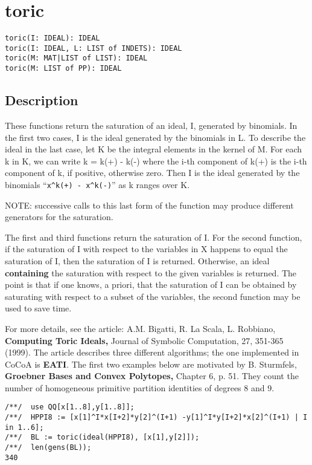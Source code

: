 \documentclass[a4paper]{mybook}
\newenvironment{command}{}{} %
\begin{document}
\section{toric}
\label{toric}
\begin{command} %


\begin{Verbatim}[label=syntax, rulecolor=\color{MidnightBlue},
frame=single]
toric(I: IDEAL): IDEAL
toric(I: IDEAL, L: LIST of INDETS): IDEAL
toric(M: MAT|LIST of LIST): IDEAL
toric(M: LIST of PP): IDEAL
\end{Verbatim}


\subsection*{Description}

These functions return the saturation of an ideal, I, generated by
binomials.  In the first two cases, I is the ideal generated by the
binomials in L.  To describe the ideal in the last case, let K be the
integral elements in the kernel of M.  For each k in K, we can write k
= k(+) - k(-) where the i-th component of k(+) is the i-th component
of k, if positive, otherwise zero.  Then I is the ideal generated by
the binomials ``\verb&x^k(+) - x^k(-)&'' as k ranges over K.
\par 
NOTE: successive calls to this last form of the function may produce
different generators for the saturation.
\par 
The first and third functions return the saturation of I.  For the
second function, if the saturation of I with respect to the variables
in X happens to equal the saturation of I, then the saturation of I is
returned.  Otherwise, an ideal \textbf{containing} the saturation with
respect to the given variables is returned.  The point is that if one
knows, a priori, that the saturation of I can be obtained by
saturating with respect to a subset of the variables, the second
function may be used to save time.
\par 
For more details, see the article:
A.M. Bigatti, R. La Scala, L. Robbiano, 
\textbf{Computing Toric Ideals,}
Journal of Symbolic Computation, 27, 351-365 (1999).
The article describes three different algorithms; the one implemented
in CoCoA is \textbf{EATI}.  The first two examples below are motivated
by B. Sturmfels, \textbf{Groebner Bases and Convex Polytopes,} Chapter
6, p. 51.  They count the number of homogeneous primitive partition
identities of degrees 8 and 9.
\begin{Verbatim}[label=example, rulecolor=\color{PineGreen}, frame=single]
/**/  use QQ[x[1..8],y[1..8]];
/**/  HPPI8 := [x[1]^I*x[I+2]*y[2]^(I+1) -y[1]^I*y[I+2]*x[2]^(I+1) | I in 1..6];
/**/  BL := toric(ideal(HPPI8), [x[1],y[2]]);
/**/  len(gens(BL));
340


\end{Verbatim}
\end{command}
\end{document}
